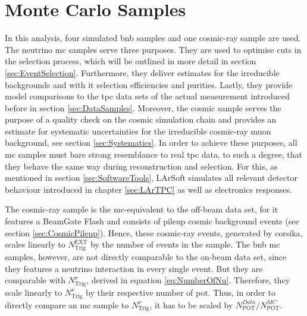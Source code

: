 \section{Monte Carlo Samples} \label{sec:MCSamples}
In this analysis, four simulated \gls{bnb} samples and one cosmic-ray sample are used. The neutrino \gls{mc} samples serve three purposes. They are used to optimise cuts in the selection process, which will be outlined in more detail in section \ref{sec:EventSelection}. Furthermore, they deliver estimates for the irreducible backgrounds and with it selection efficiencies and purities. Lastly, they provide model comparisons to the \gls{tpc} data sets of the actual measurement introduced before in section \ref{sec:DataSamples}. Moreover, the cosmic sample serves the purpose of a quality check on the cosmic simulation chain and provides an estimate for systematic uncertainties for the irreducible cosmic-ray muon background, see section \ref{sec:Systematics}. In order to achieve these purposes, all \gls{mc} samples must bare strong resemblance to real \gls{tpc} data, to such a degree, that they behave the same way during reconstruction and selection. For this, as mentioned in section \ref{sec:SoftwareTools}, \gls{LArSoft} simulates all relevant detector behaviour introduced in chapter \ref{sec:LArTPC} as well as electronics responses. 

The cosmic-ray sample is the \gls{mc}-equivalent to the off-beam data set, for it features a \gls{BeamGate} \gls{Flash} and consists of pileup cosmic background events (see section \ref{sec:CosmicPileup}). Hence, these cosmic-ray events, generated by \gls{corsika}, scales linearly to $N_\text{Trig}^\text{EXT}$ by the number of events in the sample. The \gls{bnb} \gls{mc} samples, however, are not directly comparable to the on-beam data set, since they features a neutrino interaction in every single event. But they are comparable with $N_\text{Trig}^\nu$, derived in equation \ref{eq:NumberOfNu}. Therefore, they scale linearly to $N_\text{Trig}^\nu$ by their respective number of \gls{pot}. Thus, in order to directly compare an \gls{mc} sample to $N_\text{Trig}^\nu$, it has to be scaled by $N_\text{POT}^{Data}/N_\text{POT}^{MC}$.

